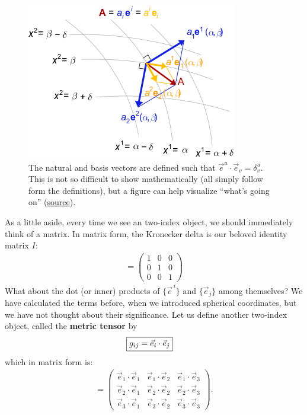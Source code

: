 \documentclass{article}
\theoremstyle{definition}
\begin{document}
\begin{figure}[h!]
	\centering
	\includegraphics[scale=0.55]{gr-fig-8.png}
	\caption{The natural and basis vectors are defined such that $\vec{e}^{u}\cdot\vec{e}_v = \delta^u_v$. This is not so difficult to show mathematically (all simply follow form the definitions), but a figure can help visualize ``what's going on'' (\href{https://en.wikipedia.org/wiki/Covariance_and_contravariance_of_vectors}{source}).} 
\end{figure}
As a little aside, every time we see an two-index object, we should immediately think of a matrix. In matrix form, the Kronecker delta is our beloved identity matrix $I$:
\begin{align*}
[\delta^i_j] = 
\begin{pmatrix}
1 & 0 & 0\\
0 & 1 & 0\\
0 & 0 & 1
\end{pmatrix}
\end{align*}
What about the dot (or inner) products of $\{\vec{e}^{\,i}\}$ and $\{\vec{e}_j \}$ among themselves? We have calculated the terms before, when we introduced spherical coordinates, but we have not thought about their significance. Let us define another two-index object, called the \textbf{metric tensor} by
\begin{align*}
\Aboxed{g_{ij} = \vec{e}_i\cdot\vec{e}_j}
\end{align*}
which in matrix form is:
\begin{align*}
[g_{ij}] = 
\begin{pmatrix}
\vec{e}_1\cdot\vec{e}_1 & \vec{e}_1\cdot\vec{e}_2 & \vec{e}_1\cdot\vec{e}_3\\
\vec{e}_2\cdot\vec{e}_1 & \vec{e}_2\cdot\vec{e}_2 & \vec{e}_2\cdot\vec{e}_3\\
\vec{e}_3\cdot\vec{e}_1 & \vec{e}_3\cdot\vec{e}_2 & \vec{e}_3\cdot\vec{e}_3
\end{pmatrix}.
\end{align*}
\end{document}
